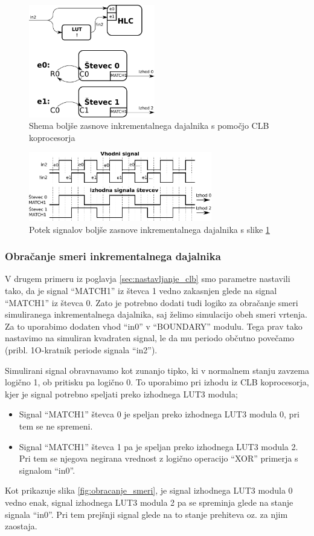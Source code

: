 \documentclass[a4paper]{article}
\begin{document}
\begin{sloppypar}
\begin{figure}[htb]
    \centerline{\includegraphics[width=5.5cm]{dobra_zasnova_shema}}
    \caption{Shema boljše zasnove inkrementalnega dajalnika s pomočjo CLB
             koprocesorja}
    \label{fig:dobra_zasnova_shema}
\end{figure}

\begin{figure}[htb]
    \centerline{\includegraphics[width=8cm]{dobra_zasnova_potek}}
    \caption{Potek signalov boljše zasnove inkrementalnega dajalnika s slike
             \ref{fig:dobra_zasnova_shema}}
    \label{fig:dobra_zasnova_potek}
\end{figure}

\subsubsection{Obračanje smeri inkrementalnega dajalnika}
V drugem primeru iz poglavja \ref{sec:nastavljanje_clb} smo parametre nastavili
tako, da je signal ``MATCH1'' iz števca 1 vedno zakasnjen glede na signal
``MATCH1'' iz števca 0. Zato je potrebno dodati tudi logiko za obračanje smeri
simuliranega inkrementalnega dajalnika, saj želimo simulacijo obeh smeri
vrtenja. Za to uporabimo dodaten vhod ``in0'' v ``BOUNDARY'' modulu. Tega prav
tako nastavimo na simuliran kvadraten signal, le da mu periodo občutno povečamo
(pribl. 1O-kratnik periode signala ``in2'').

Simulirani signal obravnavamo kot zunanjo tipko, ki v normalnem stanju zavzema
logično 1, ob pritisku pa logično 0. To uporabimo pri izhodu iz CLB
koprocesorja, kjer je signal potrebno speljati preko izhodnega LUT3 modula;
\begin{itemize}
    \item Signal ``MATCH1'' števca 0 je speljan preko izhodnega LUT3 modula 0,
        pri tem se ne spremeni.
    \item Signal ``MATCH1'' števca 1 pa je speljan preko izhodnega LUT3 modula
        2. Pri tem se njegova negirana vrednost z logično operacijo ``XOR''
        primerja s signalom ``in0''.
\end{itemize}
Kot prikazuje slika \ref{fig:obracanje_smeri}, je signal izhodnega LUT3 modula
0 vedno enak, signal izhodnega LUT3 modula 2 pa se spreminja glede na stanje
signala ``in0''. Pri tem prejšnji signal glede na to stanje prehiteva oz. za
njim zaostaja.


\end{sloppypar}
\end{document}
